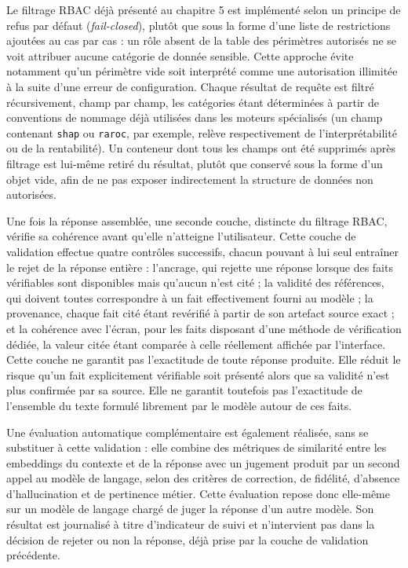 Le filtrage RBAC déjà présenté au chapitre 5 est implémenté selon un principe de refus par défaut (\textit{fail-closed}), plutôt que sous la forme d'une liste de restrictions ajoutées au cas par cas : un rôle absent de la table des périmètres autorisés ne se voit attribuer aucune catégorie de donnée sensible. Cette approche évite notamment qu'un périmètre vide soit interprété comme une autorisation illimitée à la suite d'une erreur de configuration. Chaque résultat de requête est filtré récursivement, champ par champ, les catégories étant déterminées à partir de conventions de nommage déjà utilisées dans les moteurs spécialisés (un champ contenant \texttt{shap} ou \texttt{raroc}, par exemple, relève respectivement de l'interprétabilité ou de la rentabilité). Un conteneur dont tous les champs ont été supprimés après filtrage est lui-même retiré du résultat, plutôt que conservé sous la forme d'un objet vide, afin de ne pas exposer indirectement la structure de données non autorisées.

Une fois la réponse assemblée, une seconde couche, distincte du filtrage RBAC, vérifie sa cohérence avant qu'elle n'atteigne l'utilisateur. Cette couche de validation effectue quatre contrôles successifs, chacun pouvant à lui seul entraîner le rejet de la réponse entière : l'ancrage, qui rejette une réponse lorsque des faits vérifiables sont disponibles mais qu'aucun n'est cité ; la validité des références, qui doivent toutes correspondre à un fait effectivement fourni au modèle ; la provenance, chaque fait cité étant revérifié à partir de son artefact source exact ; et la cohérence avec l'écran, pour les faits disposant d'une méthode de vérification dédiée, la valeur citée étant comparée à celle réellement affichée par l'interface. Cette couche ne garantit pas l'exactitude de toute réponse produite. Elle réduit le risque qu'un fait explicitement vérifiable soit présenté alors que sa validité n'est plus confirmée par sa source. Elle ne garantit toutefois pas l'exactitude de l'ensemble du texte formulé librement par le modèle autour de ces faits.

Une évaluation automatique complémentaire est également réalisée, sans se substituer à cette validation : elle combine des métriques de similarité entre les embeddings du contexte et de la réponse avec un jugement produit par un second appel au modèle de langage, selon des critères de correction, de fidélité, d'absence d'hallucination et de pertinence métier. Cette évaluation repose donc elle-même sur un modèle de langage chargé de juger la réponse d'un autre modèle. Son résultat est journalisé à titre d'indicateur de suivi et n'intervient pas dans la décision de rejeter ou non la réponse, déjà prise par la couche de validation précédente.

